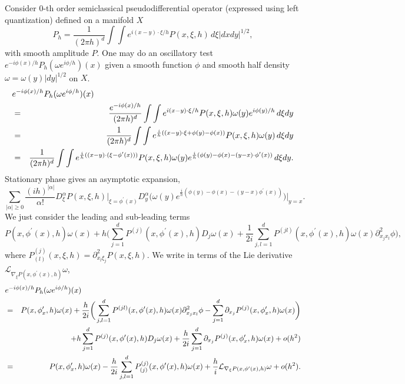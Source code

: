 \documentclass[10pt, a4paper, twoside]{amsart}
\numberwithin{equation}{section}
\theoremstyle{remark}
\begin{document}
\begin{appendix}
	Consider $0$-th order semiclassical pseudodifferential operator (expressed using left  quantization) defined on a manifold $X$ $$P_h  = \frac{1}{(2\pi h)^d} \int\int e^{i(x - y) \cdot \xi / h} P(x, \xi, h)  \, d\xi |dxdy|^{1/2},$$ with smooth amplitude $P$. One may do an oscillatory test $e^{-i \phi(x) / h} P_h (\omega e^{i \phi / h}) (x)$ given a smooth function $\phi$ and smooth half density $\omega = \omega(y) |dy|^{1/2}$ on $X$. \begin{eqnarray*}
	\lefteqn{e^{- i \phi(x) / h} P_h (\omega e^{i \phi / h})(x)}\\
	& = & \frac{e^{- i \phi(x) / h}}{(2\pi h)^d} \int\int e^{i(x - y) \cdot \xi / h} P(x, \xi, h) \omega(y) e^{i \phi(y) / h} \, d\xi dy \\ & = & \frac{1}{(2\pi h)^d} \int\int e^{\frac{i}{h} ( (x - y)\cdot\xi + \phi(y) - \phi(x) )} P(x, \xi, h) \omega(y) \, d\xi dy\\ & = & \frac{1}{(2\pi h)^d} \int\int e^{\frac{i}{h} ((x - y)\cdot(\xi - \phi^\prime(x)))} P(x, \xi, h) \omega(y) e^{\frac{i}{h}(\phi(y) - \phi(x) - (y - x)\cdot\phi^\prime(x))}\, d\xi dy.
	\end{eqnarray*} Stationary phase gives an asymptotic expansion, $$\sum_{|\alpha| \geq 0} \frac{(ih)^{|\alpha|}}{\alpha !} D_\xi^\alpha P(x, \xi, h)\bigg|_{\xi = \phi^\prime(x)} D_y^\alpha \Big(\omega(y) e^{\frac{i}{h}(\phi(y) - \phi(x) - (y - x)\phi^\prime(x))}\Big)\bigg|_{y = x}.$$ We just consider the leading and sub-leading terms $$P(x, \phi^\prime(x), h)\omega(x) + h\bigg( \sum_{j = 1}^d P^{(j)}(x, \phi^\prime(x), h) D_j \omega(x) + \frac{1}{2i} \sum_{j, l = 1}^d P^{(jl)}(x, \phi^\prime(x), h) \omega(x) \partial_{x_j x_l}^2 \phi\bigg),$$ where $P^{(j)}_{(l)}(x, \xi, h) = \partial_{x_l \xi_j}^2 P(x, \xi, h)$.
	 We write in terms of the Lie derivative $\mathcal{L}_{\nabla_{\xi} P(x, \phi^\prime(x), h)} \omega$, \begin{eqnarray*}\lefteqn{e^{-i\phi(x) / h}P_h(\omega e^{i\phi / h})(x)}\\&=& P(x, \phi^\prime_x, h) \omega(x)  + \frac{h}{2i}\bigg(\sum_{j, l = 1}^d P^{(jl)}(x, \phi^\prime(x), h) \omega(x) \partial_{x_j x_l}^2 \phi - \sum_{j = 1}^d  \partial_{x_j} P^{(j)}(x, \phi^\prime_x, h) \omega(x)\bigg) \\&& + h \sum_{j = 1}^d P^{(j)}(x, \phi^\prime(x), h) D_j \omega(x) + \frac{h}{2i} \sum_{j = 1}^d  \partial_{x_j} P^{(j)}(x, \phi^\prime_x, h) \omega(x) + o(h^2)\\&=& P(x, \phi^\prime_x, h) \omega(x)  - \frac{h}{2i} \sum_{j, l = 1}^d P^{(j)}_{(j)}(x, \phi^\prime(x), h) \omega(x)   + \frac{h}{i}\mathcal{L}_{\nabla_\xi P(x, \phi^\prime(x), h)} \omega + o(h^2).\end{eqnarray*}
	

\end{appendix}
\end{document}
